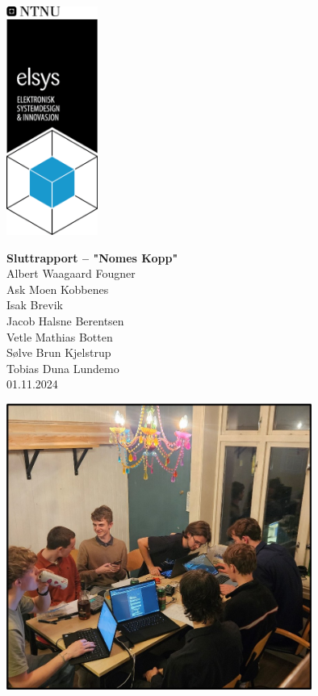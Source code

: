 \documentclass{article}
\begin{document}
\begin{titlepage}
    \begin{minipage}{0.3\textwidth}
        \includegraphics[width=3cm]{Elsyslogo.png}
    \end{minipage}
    \hfill
    \begin{minipage}{0.65\textwidth}
        \raggedright
        \LARGE \textbf{Sluttrapport – "Nomes Kopp"} \\[1em]
        \large Albert Waagaard Fougner \\ Ask Moen Kobbenes \\ Isak Brevik \\ Jacob Halsne Berentsen \\ Vetle Mathias Botten \\ Sølve Brun Kjelstrup \\ Tobias Duna Lundemo \\[1em]
        \normalsize 01.11.2024
    \end{minipage}
    \vfill
    \begin{center}
        \includegraphics[width=10cm]{Gruppebilde1.jpg}
    \end{center}
\end{titlepage}
\end{document}
